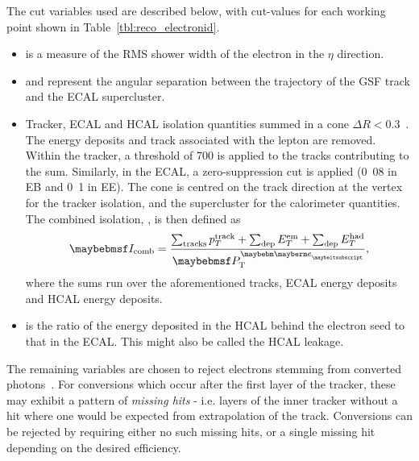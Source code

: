 The cut variables used are described below, with cut-values for each working
point shown in Table~\ref{tbl:reco_electronid}.
\begin{itemize}
\item \sigmaieta is a measure of the \ac{RMS} shower width of the electron
  in the $\eta$ direction.
\item \deltaphiin and \deltaetain represent the angular separation between the
  trajectory of the \ac{GSF} track and the \ac{ECAL} supercluster.
\item Tracker, \ac{ECAL} and \ac{HCAL} isolation quantities summed in a cone
  $\Delta R < 0.3$~\cite{lepton_isolation_an}. The energy deposits and track
  associated with the lepton are removed. Within the tracker, a threshold of
  \unit{700}{\MeV} is applied to the tracks contributing to the sum. Similarly,
  in the \ac{ECAL}, a zero-suppression cut is applied (\unit{0.08}{\GeV} in
  \ac{EB} and \unit{0.1}{\GeV} in \ac{EE}). The cone is centred on the track
  direction at the vertex for the tracker isolation, and the supercluster for
  the calorimeter quantities. The combined isolation, \CombIso, is then defined
  as
  \begin{equation*}
    \CombIso = \frac{\sum_{\textrm{tracks}} p_T^{\textrm{track}} + \sum_{\textrm{dep}}
    E_T^{\textrm{em}} + \sum_{\textrm{dep}} E_T^{\textrm{had}}}{\Pte},
   \end{equation*}
   where the sums run over the aforementioned tracks, \ac{ECAL} energy deposits
   and \ac{HCAL} energy deposits.
\item \HoverE is the ratio of the energy deposited in the \ac{HCAL} behind the
  electron seed to that in the \ac{ECAL}. This might also be called the
  \ac{HCAL} leakage.
\end{itemize}

The remaining variables are chosen to reject electrons stemming from converted
photons~\cite{cms_an_2009_159}. For conversions which occur after the first
layer of the tracker, these may exhibit a pattern of \emph{missing hits} -
i.e. layers of the inner tracker without a hit where one would be expected from
extrapolation of the track. Conversions can be rejected by requiring either no
such missing hits, or a single missing hit depending on the desired efficiency.

